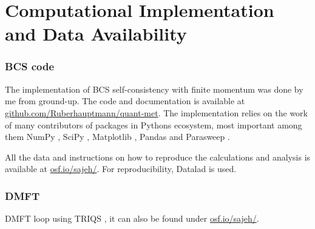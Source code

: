 \documentclass[../notes.tex]{subfiles}
\begin{document}
\raggedbottom
	
\chapter{Computational Implementation and Data Availability}

\subsection*{BCS code}

The implementation of BCS self-consistency with finite momentum was done by me from ground-up.
The code and documentation is available at \href{https://github.com/Ruberhauptmann/quant-met}{github.com/Ruberhauptmann/quant-met}.
The implementation relies on the work of many contributors of packages in Pythons ecosystem, most important among them NumPy \cite{harrisArrayProgrammingNumPy2020}, SciPy \cite{virtanenSciPy10Fundamental2020}, Matplotlib \cite{hunterMatplotlib2DGraphics2007}, Pandas \cite{mckinneyDataStructuresStatistical2010, thepandasdevelopmentteamPandasdevPandasPandas2024} and Parasweep \cite{bachParasweepTemplatebasedUtility2021}.

All the data and instructions on how to reproduce the calculations and analysis is available at \href{https://osf.io/sajeh/}{osf.io/sajeh/}.
For reproducibility, Datalad \cite{halchenkoDataLadDistributedSystem2021} is used.

\subsection*{DMFT}

DMFT loop using TRIQS \cite{parcolletTRIQSToolboxResearch2015}, it can also be found under \href{https://osf.io/sajeh/}{osf.io/sajeh/}.
\end{document}
